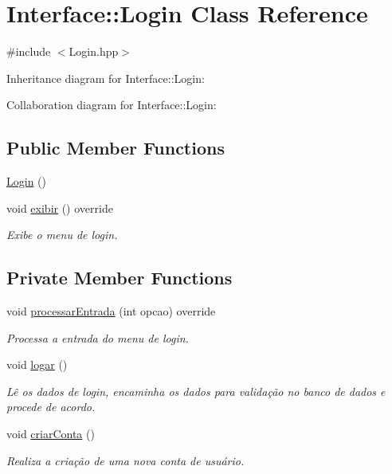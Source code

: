 \hypertarget{class_interface_1_1_login}{}\section{Interface\+:\+:Login Class Reference}
\label{class_interface_1_1_login}


{\ttfamily \#include $<$Login.\+hpp$>$}



Inheritance diagram for Interface\+:\+:Login\+:


Collaboration diagram for Interface\+:\+:Login\+:
\subsection*{Public Member Functions}
\begin{DoxyCompactItemize}
\item 
\hyperlink{class_interface_1_1_login_ab0fdc87ab4af1504a687e7a4a0c860be}{Login} ()
\item 
void \hyperlink{class_interface_1_1_login_a5db83876c6d264c4b61121e0e0b9ca38}{exibir} () override
\begin{DoxyCompactList}\small\item\em Exibe o menu de login. \end{DoxyCompactList}\end{DoxyCompactItemize}
\subsection*{Private Member Functions}
\begin{DoxyCompactItemize}
\item 
void \hyperlink{class_interface_1_1_login_aeaba3261aa3a44806e98fcf67375e408}{processar\+Entrada} (int opcao) override
\begin{DoxyCompactList}\small\item\em Processa a entrada do menu de login. \end{DoxyCompactList}\item 
void \hyperlink{class_interface_1_1_login_a96f4d0d8c4903bab279fe240a09354d5}{logar} ()
\begin{DoxyCompactList}\small\item\em Lê os dados de login, encaminha os dados para validação no banco de dados e procede de acordo. \end{DoxyCompactList}\item 
void \hyperlink{class_interface_1_1_login_aab280108f0fba4ef1d848ab2922d628a}{criar\+Conta} ()
\begin{DoxyCompactList}\small\item\em Realiza a criação de uma nova conta de usuário. \end{DoxyCompactList}\end{DoxyCompactItemize}


